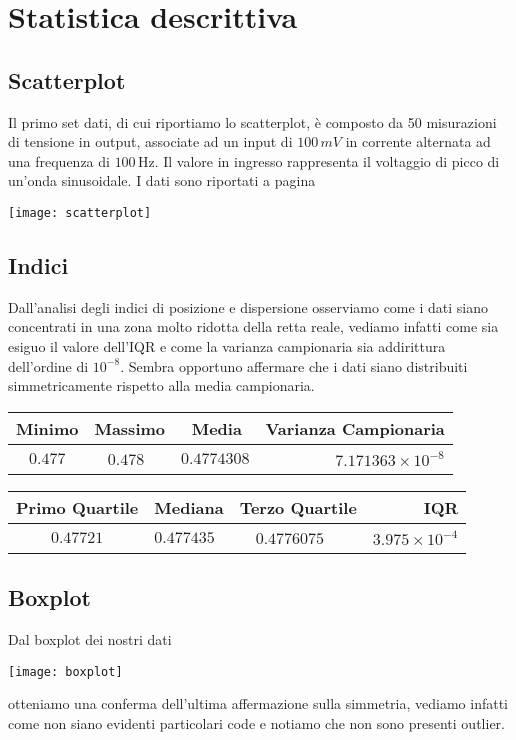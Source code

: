 \documentclass[a4paper]{article}
\begin{document}
		
	\section{Statistica descrittiva}
	\medskip
	\subsection{Scatterplot}
	Il primo set dati, di cui riportiamo lo scatterplot, è composto da 50 misurazioni di tensione in output, associate ad un input di $100\,mV$ in corrente alternata ad una frequenza di $100\,$Hz. Il valore in ingresso rappresenta il voltaggio di picco di un’onda sinusoidale. I dati sono riportati a pagina \pageref{set1}
	\begin{center}
		\texttt{[image: scatterplot]} 
	\end{center}
	\subsection{Indici}
	Dall’analisi degli indici di posizione e dispersione osserviamo come i dati siano concentrati in una zona molto ridotta della retta reale, vediamo infatti come sia esiguo il valore dell’IQR e come la varianza campionaria sia addirittura dell'ordine di $10^{-8}$. Sembra opportuno affermare che i dati siano distribuiti simmetricamente rispetto alla media campionaria.
	\bigskip\bigskip
	
	\begin{center}
		\begin{tabular}{cllr} 
			\toprule 
			Minimo & Massimo & \,\,\,\,Media & Varianza Campionaria \\ 
			\midrule
			$0.477$ & \,\,\,\,\,$0.478$ & $0.4774308$ & $7.171363\times 10^{-8}$ \\
			\bottomrule
		\end{tabular}
	
\bigskip
\bigskip 
\bigskip

\begin{tabular}{cllr}
	\toprule
Primo Quartile & Mediana & Terzo Quartile &IQR \\ 
	\midrule 
 $0.47721$ & $0.477435$ & \,\,\,\,\,\,$0.4776075$ & $3.975\times10^{-4}$\\
	   \bottomrule 
\end{tabular}
	\end{center}

\bigskip 
\bigskip

\subsection{Boxplot}
\bigskip
Dal boxplot dei nostri dati
\begin{center}
	 
	\texttt{[image: boxplot]} 

\end{center}
otteniamo una conferma dell'ultima affermazione sulla simmetria, vediamo infatti come non siano evidenti particolari code e notiamo che non sono presenti outlier.
\end{document}
